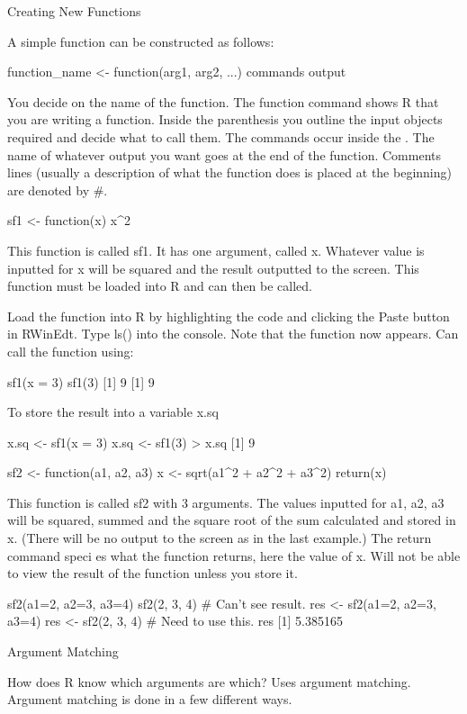  

Creating New Functions
 
A simple function can be constructed as follows:

 
function_name <- function(arg1, arg2, ...){
commands
output
}

 
You decide on the name of the function.
The function command shows R that you are writing a function.
Inside the parenthesis you outline the input objects required and decide what to call them.
The commands occur inside the { }.
The name of whatever output you want goes at the end of the function.
Comments lines (usually a description of what the function does is placed at the beginning) are denoted by #.
 


sf1 <- function(x){
x^2
}


This function is called sf1. It has one argument, called x. Whatever value is inputted for x will be squared and the result outputted to the screen. This function must be loaded into R and can then be called.

 
Load the function into R by highlighting the code and clicking the Paste button in RWinEdt.
Type ls() into the console. Note that the function now appears. Can call the function using:
 


sf1(x = 3) sf1(3)
[1] 9 [1] 9



 
To store the result into a variable x.sq



x.sq <- sf1(x = 3) x.sq <- sf1(3)
> x.sq
[1] 9
 
sf2 <- function(a1, a2, a3){
x <- sqrt(a1^2 + a2^2 + a3^2)
return(x)
}



 
This function is called sf2 with 3 arguments. The values inputted for a1, a2, a3 will be squared, summed and the square root of the sum calculated and stored in x. (There will be no output to the screen as in the last example.) The return command speci es what the function returns, here the value of x. Will not be able to view the result of the function unless you store it.
 
sf2(a1=2, a2=3, a3=4) sf2(2, 3, 4) # Can't see result.
res <- sf2(a1=2, a2=3, a3=4) res <- sf2(2, 3, 4) # Need to use this.
res
[1] 5.385165
 
Argument Matching
 
How does R know which arguments are which? Uses argument matching.  Argument matching is done in a few different ways.
 
